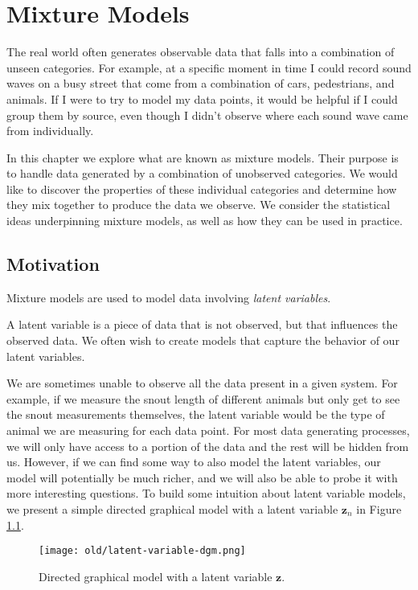 \chapter{Mixture Models}
The real world often generates observable data that falls into a combination of unseen categories. For example, at a specific moment in time I could record sound waves on a busy street that come from a combination of cars, pedestrians, and animals. If I were to try to model my data points, it would be helpful if I could group them by source, even though I didn't observe where each sound wave came from individually.

In this chapter we explore what are known as mixture models. Their purpose is to handle data generated by a combination of unobserved categories. We would like to discover the properties of these individual categories and determine how they mix together to produce the data we observe. We consider the statistical ideas underpinning mixture models, as well as how they can be used in practice.

\section{Motivation}
Mixture models are used to model data involving \textit{latent variables}.

\begin{definition}
    A latent variable is a piece of data that is not observed, but that influences the observed data. We often wish to create models that capture the behavior of our latent variables.
\end{definition}

We are sometimes unable to observe all the data present in a given system. For example, if we measure the snout length of different animals but only get to see the snout measurements themselves, the latent variable would be the type of animal we are measuring for each data point. For most data generating processes, we will only have access to a portion of the data and the rest will be hidden from us. However, if we can find some way to also model the latent variables, our model will potentially be much richer, and we will also be able to probe it with more interesting questions. To build some intuition about latent variable models, we present a simple directed graphical model with a latent variable $\textbf{z}_n$ in Figure \ref{fig:lvm-dgm}.

\begin{figure}
    \centering
    \texttt{[image: old/latent-variable-dgm.png]}
    \caption{Directed graphical model with a latent variable $\textbf{z}$.}
    \label{fig:lvm-dgm}
\end{figure}

